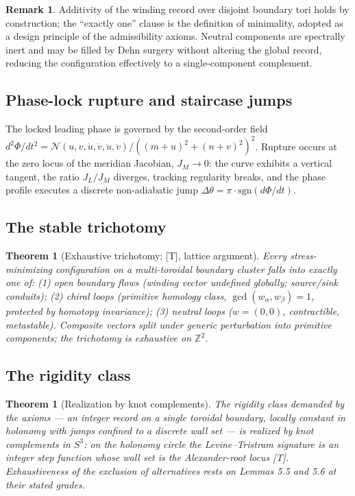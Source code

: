 \documentclass[11pt]{article}
\theoremstyle{definition}
\newtheorem{remark}[definition]{Remark}
\theoremstyle{plain}
\newtheorem{theorem}[definition]{Theorem}
\begin{document}
\begin{remark}
Additivity of the winding record over disjoint boundary tori holds by construction;
the ``exactly one'' clause is the definition of minimality, adopted as a design
principle of the admissibility axioms. Neutral components are spectrally inert and
may be filled by Dehn surgery without altering the global record, reducing the
configuration effectively to a single-component complement.
\end{remark}

\subsection{Phase-lock rupture and staircase jumps}

The locked leading phase is governed by the second-order field
$d^2\Phi/dt^2 = \mathcal{N}(u,v,\dot u,\dot v,\ddot u,\ddot v)/((m+u)^2+(n+v)^2)^2$.
Rupture occurs at the zero locus of the meridian Jacobian, $J_M \to 0$: the curve
exhibits a vertical tangent, the ratio $J_L/J_M$ diverges, tracking regularity
breaks, and the phase profile executes a discrete non-adiabatic jump
$\Delta\theta = \pi\cdot\mathrm{sgn}(d\Phi/dt)$.

\subsection{The stable trichotomy}

\begin{theorem}[Exhaustive trichotomy; {[T]}, lattice argument]
Every stress-minimizing configuration on a multi-toroidal boundary cluster falls
into exactly one of: (1) open boundary flows (winding vector undefined globally;
source/sink conduits); (2) chiral loops (primitive homology class,
$\gcd(w_\alpha,w_\beta) = 1$, protected by homotopy invariance); (3) neutral loops
($w = (0,0)$, contractible, metastable). Composite vectors split under generic
perturbation into primitive components; the trichotomy is exhaustive on
$\mathbb{Z}^2$.
\end{theorem}

\subsection{The rigidity class}

\begin{theorem}[Realization by knot complements]
The rigidity class demanded by the axioms --- an integer record on a single
toroidal boundary, locally constant in holonomy with jumps confined to a discrete
wall set --- is realized by knot complements in $S^3$: on the holonomy circle the
Levine--Tristram signature is an integer step function whose wall set is the
Alexander-root locus [T]. Exhaustiveness of the exclusion of alternatives rests on
Lemmas 5.5 and 5.6 at their stated grades.
\end{theorem}
\end{document}
